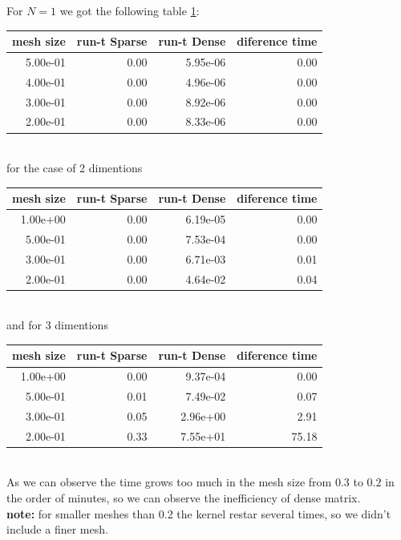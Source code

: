 \documentclass{article}
\begin{document}
For $N=1$ we got the following table \ref{tab:1d}:
\begin{table}[h!]
  \begin{tabular}{rrrr}
    \hline\hline
    \textbf{mesh size} & \textbf{run-t Sparse} & \textbf{run-t Dense } & \textbf{diference time} \\ \hline
    5.00e-01 & 0.00 & 5.95e-06 & 0.00 \\
    4.00e-01 & 0.00 & 4.96e-06 & 0.00 \\
    3.00e-01 & 0.00 & 8.92e-06 & 0.00 \\
    2.00e-01 & 0.00 & 8.33e-06 & 0.00 \\ \hline\hline
  \end{tabular}
  \label{tab:1d}
\end{table}\\
for the case of 2 dimentions
\begin{table}[h!]
  \begin{tabular}{rrrr}
    \hline\hline
    \textbf{mesh size} & \textbf{run-t Sparse} & \textbf{run-t Dense} & \textbf{diference time} \\\hline
    1.00e+00 & 0.00 & 6.19e-05 & 0.00 \\
    5.00e-01 & 0.00 & 7.53e-04 & 0.00 \\
    3.00e-01 & 0.00 & 6.71e-03 & 0.01 \\
    2.00e-01 & 0.00 & 4.64e-02 & 0.04 \\\hline\hline
  \end{tabular}
\end{table}\\
and for 3 dimentions 
\begin{table}[h!]
  \begin{tabular}{rrrr}
    \hline\hline
    \textbf{mesh size} & \textbf{run-t Sparse} & \textbf{run-t Dense} & \textbf{diference time} \\\hline
    1.00e+00 & 0.00 & 9.37e-04 & 0.00 \\
    5.00e-01 & 0.01 & 7.49e-02 & 0.07 \\
    3.00e-01 & 0.05 & 2.96e+00 & 2.91 \\
    2.00e-01 & 0.33 & 7.55e+01 & 75.18 \\\hline\hline
  \end{tabular}
\end{table}\\
As we can observe the time grows too much in the mesh size from $0.3$ to $0.2$ in the order of minutes, so we can observe the inefficiency of dense matrix.\\
\textbf{note:} for smaller meshes than 0.2 the kernel restar several times, so we didn't include a finer mesh.
\end{document}
